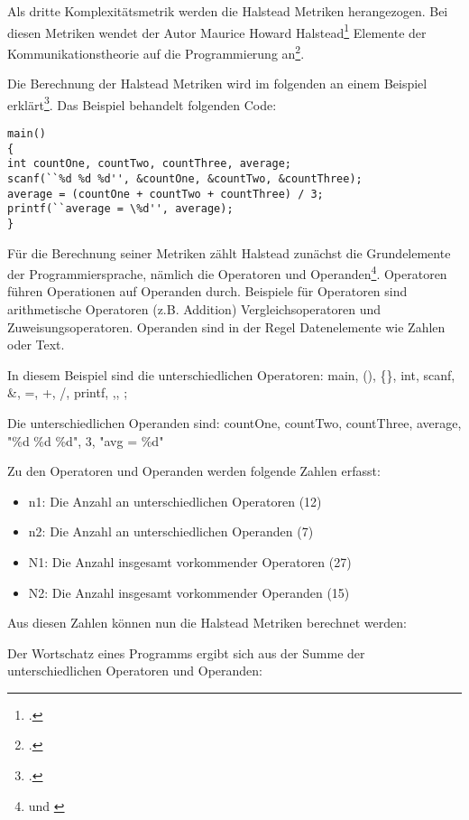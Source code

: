 Als dritte Komplexitätsmetrik werden die Halstead Metriken herangezogen.
Bei diesen Metriken wendet der Autor Maurice Howard Halstead\footcite[Vgl. ][]{halsteadElementsSoftwareScience1979}
Elemente der Kommunikationstheorie auf die Programmierung an\footcite[Vgl. ][S. 183]{sneedSoftwareZahlenVermessung2010}.

Die Berechnung der Halstead Metriken wird im folgenden an einem Beispiel
erklärt\footcite[Vgl. ][S. 184]{sneedSoftwareZahlenVermessung2010}. Das Beispiel behandelt
folgenden Code:

\lstset{language=C}
\begin{lstlisting}
main()
{
int countOne, countTwo, countThree, average;
scanf(``%d %d %d'', &countOne, &countTwo, &countThree);
average = (countOne + countTwo + countThree) / 3;
printf(``average = \%d'', average);
}
\end{lstlisting}


Für die Berechnung seiner Metriken zählt Halstead zunächst die
Grundelemente der Programmiersprache, nämlich die Operatoren und
Operanden\footnote{\cite[Vgl. ][S. 183]{sneedSoftwareZahlenVermessung2010} und \cite[S. 2]{rumreichExaminingSoftwareDesign2019}}. Operatoren führen Operationen auf Operanden durch. Beispiele
für Operatoren sind arithmetische Operatoren (z.B. Addition)
Vergleichsoperatoren und Zuweisungsoperatoren. Operanden sind in der
Regel Datenelemente wie Zahlen oder Text.

In diesem Beispiel sind die unterschiedlichen Operatoren: main, (),
\{\}, int, scanf, \&, =, +, /, printf, ,, ;

Die unterschiedlichen Operanden sind: countOne, countTwo, countThree,
average, "\%d \%d \%d", 3, "avg = \%d"

Zu den Operatoren und Operanden werden folgende Zahlen erfasst:

\begin{itemize}
\item
  n1: Die Anzahl an unterschiedlichen Operatoren (12)
\item
  n2: Die Anzahl an unterschiedlichen Operanden (7)
\item
  N1: Die Anzahl insgesamt vorkommender Operatoren (27)
\item
  N2: Die Anzahl insgesamt vorkommender Operanden (15)
\end{itemize}

Aus diesen Zahlen können nun die Halstead Metriken berechnet werden:

Der Wortschatz eines Programms ergibt sich aus der Summe der
unterschiedlichen Operatoren und Operanden:

